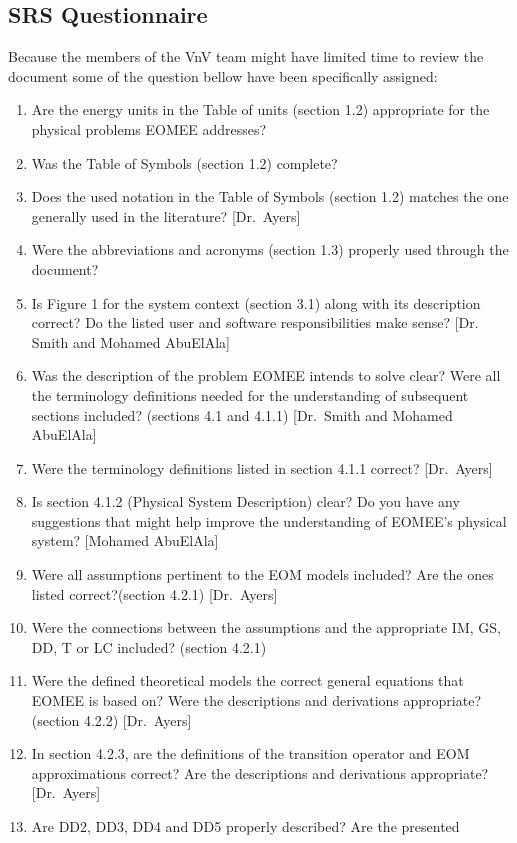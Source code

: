 \documentclass[12pt, titlepage]{article}
\begin{document}
\subsection{SRS Questionnaire}
\label{section:srsreview}
Because the members of the VnV team might have limited time to review the 
document some of the question bellow have been specifically assigned:
\begin{enumerate}
	\item Are the energy units in the Table of units (section 1.2) appropriate 
	for the physical problems EOMEE addresses?
	\item Was the Table of Symbols (section 1.2) complete? 
	\item Does the used notation in the Table of Symbols (section 1.2) matches 
	the one generally used in the literature? [Dr.\ Ayers]
	\item Were the abbreviations and acronyms (section 1.3) properly used 
	through the document?
	\item Is Figure 1 for the system context (section 3.1) along with its 
	description correct? Do the listed user and software responsibilities make 
	sense? [Dr. Smith and Mohamed AbuElAla]
	\item Was the description of the problem EOMEE intends to solve clear? Were 
	all the terminology definitions needed for the understanding of subsequent 
	sections included? (sections 4.1 and 4.1.1) [Dr.\ Smith 
	and Mohamed AbuElAla]
	\item Were the terminology definitions listed in section 4.1.1 correct? 
	[Dr.\ Ayers]
	\item Is section 4.1.2 (Physical System Description) clear? Do you have any 
	suggestions that might help improve the understanding of EOMEE's physical 
	system? [Mohamed AbuElAla]
	\item Were all assumptions pertinent to the EOM models included? Are the 
	ones listed correct?(section 4.2.1) [Dr.\ Ayers]
	\item Were the connections between the assumptions and the appropriate IM, 
	GS, DD, T or LC included? (section 4.2.1)
	\item Were the defined theoretical models the correct general equations 
	that EOMEE is based on? Were the descriptions and derivations appropriate? 
	(section 4.2.2) [Dr.\ Ayers]
	\item In section 4.2.3, are the definitions of the transition operator and 
	EOM approximations correct? Are the descriptions and derivations 
	appropriate? [Dr.\ Ayers]
	\item Are DD2, DD3, DD4 and DD5 properly described? Are the presented 

\end{enumerate}
\end{document}
